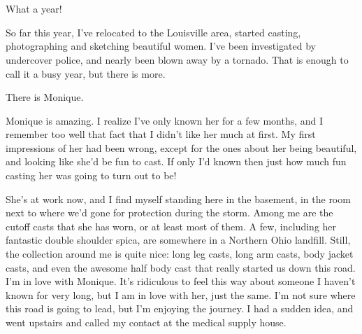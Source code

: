 \chapter{~}
What a year!

So far this year, I've relocated to the Louisville area, started casting, photographing and
sketching beautiful women. I've been investigated by undercover police, and nearly been blown
away by a tornado. That is enough to call it a busy year, but there is more.

There is Monique.

Monique is amazing. I realize I've only known her for a few months, and I remember too well
that fact that I didn't like her much at first. My first impressions of her had been wrong,
except for the ones about her being beautiful, and looking like she'd be fun to cast. If only
I'd known then just how much fun casting her was going to turn out to be!

She's at work now, and I find myself standing here in the basement, in the room next to
where we'd gone for protection during the storm. Among me are the cutoff casts that she has
worn, or at least most of them. A few, including her fantastic double shoulder spica, are
somewhere in a Northern Ohio landfill. Still, the collection around me is quite nice: long leg
casts, long arm casts, body jacket casts, and even the awesome half body cast that really
started us down this road. I'm in love with Monique. It's ridiculous to feel this way about
someone I haven't known for very long, but I am in love with her, just the same. I'm not sure
where this road is going to lead, but I'm enjoying the journey. I had a sudden idea, and went
upstairs and called my contact at the medical supply house.

